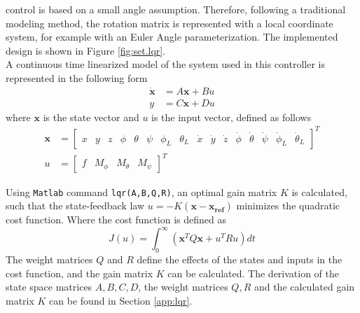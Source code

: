  control is based on a small angle assumption. 
Therefore, following a traditional modeling method, the rotation matrix is represented with a local coordinate system, 
for example with an Euler Angle parameterization. 
The implemented  design is shown in Figure \ref{fig:set.lqr}.\\
A continuous time linearized model of the system used in this controller is represented in the following form 
\begin{align}\label{eq:ss}
\mathbf{\dot{x} }&=A\mathbf{x}+Bu\\
y&=C\mathbf{x}+Du
\end{align}
where $ \mathbf{x} $ is the state vector and $ u $ is the input vector, defined as follows
\begin{equation}\label{eq:state}
\begin{aligned}
\mathbf{x}&=\begin{bmatrix}
x&y&z&\phi&\theta&\psi&\phi_L&\theta_L&\dot{x}&\dot{y}&\dot{z}&\dot{\phi}&\dot{\theta}&\dot{\psi}&\dot{\phi}_L&\dot{\theta}_L
\end{bmatrix}^T\\
u&=\begin{bmatrix}
f&M_\phi&M_\theta&M_\psi
\end{bmatrix}^T
\end{aligned}
\end{equation}

Using \texttt{Matlab} command \texttt{lqr(A,B,Q,R)}, an optimal gain matrix $ K $ is calculated, such that the state-feedback law $ u=-K(\mathbf{x-x_{ref}}) $ \cite{Reyes-Valeria2013} minimizes the quadratic cost function. Where the cost function is defined as 
\begin{equation}\label{key}
J(u)=\int_{0}^{\infty}(\mathbf{x}^TQ\mathbf{x}+u^TRu)dt
\end{equation}
The weight matrices $ Q $ and $ R $ define the effects of the states and inputs in the cost function, and the gain matrix $K $ can be calculated. 
The derivation of the state space matrices $ A, B, C, D $, the weight matrices $ Q,R $ and the calculated gain matrix $ K $ can be found in Section \ref{app:lqr}. 


